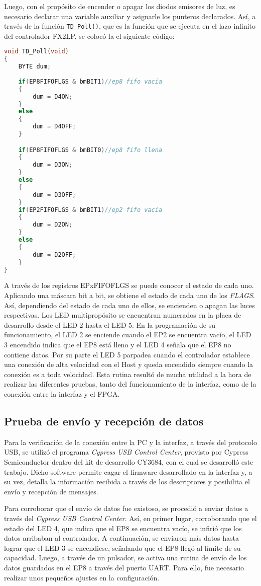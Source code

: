 Luego, con el propósito de encender o apagar los diodos emisores de luz, es necesario declarar una variable auxiliar y asignarle los punteros declarados. Así, a través de la función \verb|TD_Poll()|, que es la función que se ejecuta en el lazo infinito del controlador FX2LP, se colocó la el siguiente código:

	\begin{lstlisting}[language=C,backgroundcolor=\color{gray!30}]
void TD_Poll(void)  
{
	BYTE dum;
	
	if(EP8FIFOFLGS & bmBIT1)//ep8 fifo vacia
	{
		dum = D4ON;
	}
	else
	{
		dum = D4OFF;
	}

	if(EP8FIFOFLGS & bmBIT0)//ep8 fifo llena
	{
		dum = D3ON;
	}
	else
	{
		dum = D3OFF;
	}
	if(EP2FIFOFLGS & bmBIT1)//ep2 fifo vacia
	{
		dum = D2ON;
	}
	else
	{
		dum = D2OFF;
	}
}
	\end{lstlisting}

A través de los registros EPxFIFOFLGS se puede conocer el estado de cada uno. Aplicando una máscara bit a bit, se obtiene el estado de cada uno de los \textit{FLAGS}. Así, dependiendo del estado de cada uno de ellos, se encienden o apagan las luces respectivas.
Los LED multipropósito se encuentran numerados en la placa de desarrollo desde el LED 2 hasta el LED 5. En la programación de su funcionamiento, el LED 2 se enciende cuando el EP2 se encuentra vacío, el LED 3 encendido indica que el EP8 está lleno y el LED 4 señala que el EP8 no contiene datos. Por su parte el LED 5 parpadea cuando el controlador establece una conexión de alta velocidad con el Host y queda encendido siempre cuando la conexión es a toda velocidad. 
Esta rutina resultó de mucha utilidad a la hora de realizar las diferentes pruebas, tanto del funcionamiento de la interfaz, como de la conexión entre la interfaz y el FPGA.

\subsection{Prueba de envío y recepción de datos}
	Para la verificación de la conexión entre la PC y la interfaz, a través del protocolo USB, se utilizó el programa {\it Cypress USB Control Center}, provisto por Cypress Semiconductor dentro del kit de desarrollo CY3684, con el cual se desarrolló este trabajo. Dicho software permite cagar el firmware desarrollado en la interfaz y, a su vez, detalla la información recibida a través de los descriptores y posibilita el envío y recepción de mensajes.
	
	Para corroborar que el envío de datos fue existoso, se procedió a enviar datos a través del {\it Cypress USB Control Center}. Así, en primer lugar, corroborando que el estado del LED 4, que indica que el EP8 se encuentra vacío, se infirió que los datos arribaban al controlador. A continuación, se enviaron más datos hasta lograr que el LED 3 se encendiese, señalando que el EP8 llegó al límite de su capacidad. Luego, a través de un pulsador, se activa una rutina de envío de los datos guardados en el EP8 a través del puerto UART. Para ello, fue necesario realizar unos pequeños ajustes en la configuración.
	
